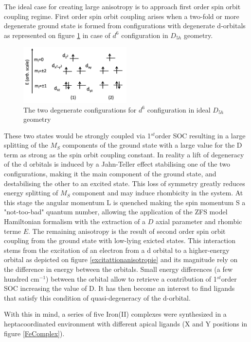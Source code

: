 \documentclass[10pt]{report}
\numberwithin{equation}{section}
\begin{document}
The ideal case for creating large anisotropy is to approach first order spin orbit coupling regime. 
First order spin orbit coupling arises when a two-fold or more degenerate ground state is formed from configurations with degenerate d-orbitals as represented on figure \ref{Fer_config} in case of $d^6$ configuration in $D_{5h}$ geometry.

\begin{figure}[h!]
    \centering
    \includegraphics[width=0.5\textwidth]{Images/DiagOrbFed6.png}
    \caption{The two degenerate configurations for $d^6$ configuration in ideal $D_{5h}$ geometry}
    \label{Fer_config}
\end{figure}

These two states would be strongly coupled via 1$^{st}$order SOC resulting in a large splitting of the $M_S$ components of the ground state with a large value for the D term as strong as the spin orbit coupling constant.
In reality a lift of degeneracy of the d orbitals is induced by a Jahn-Teller effect stabilising one of the two configurations, making it the main component of the ground state, and destabilising the other to an excited state.
This loss of symmetry greatly reduces energy splitting of $M_S$ component and may induce rhombicity in the system. 
At this stage the angular momentum L is quenched making the spin momentum S a "not-too-bad" quantum number, allowing the application of the ZFS model Hamiltonian formalism with the extraction of a $D$ axial parameter and rhombic terme $E$.
The remaining anisotropy is the result of second order spin orbit coupling from the ground state with low-lying exicted states.
This interaction stems from the excitation of an electron from a d orbital to a higher-energy orbital as depicted on figure \ref{excitattionanisotropie} and its magnitude rely on the difference in energy between the orbitals.
Small energy differences (a few hundred cm$^{-1}$) between the orbital allow to retrieve a contribution of 1$^{st}$order SOC increasing the value of D.
It has then become an interest to find ligands that satisfy this condition of quasi-degeneracy of the d-orbital.

With this in mind, a series of five Iron(II) complexes were synthesized in a heptacoordinated environment with different apical ligands (X and Y positions in figure \ref{FeComplex}).
\end{document}
